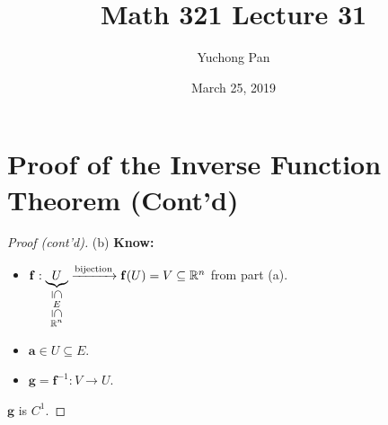 \documentclass[letterpaper, reqno,11pt]{article}
\newcommand{\RR}{\mathbb{R}}
\begin{document}
\title{Math 321 Lecture 31}
\author{Yuchong Pan}
\date{March 25, 2019}
\newtheorem{thm}{Theorem}
\newtheorem{defn}{Definition}
\newtheorem*{remark}{Remark}
\newtheorem{claim}{Claim}
\newtheorem{cor}{Corollary}
\newtheorem{lemma}{Lemma}
\newtheorem{prop}{Proposition}
\newtheorem{fact}{Fact}
\newtheorem{observation}{Observation}
\maketitle
%

\section{Proof of the Inverse Function Theorem (Cont'd)}

\begin{proof}[Proof (cont'd)]
  (b) {\bf Know:}
  \begin{itemize}
  \item $\mathbf f: \underbrace{U}_{\substack{\rotatebox[origin=c]{270}{$\subseteq$} \\ E \\ \rotatebox[origin=c]{270}{$\subseteq$} \\ \RR^n}} \xrightarrow{\text{bijection}} \mathbf f(U) = V \subseteq \RR^n$ from part (a).
  \item $\mathbf a \in U \subseteq E$.
  \item $\mathbf g = \mathbf f^{-1} : V \to U$.
  \end{itemize}
  
   $\mathbf g$ is $C^1$.

  \medskip


\end{proof}
\end{document}
